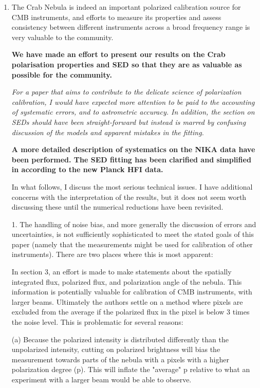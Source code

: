 \documentclass[12pt]{article}
\begin{document}
\begin{enumerate}
    \item 
{
The Crab Nebula is indeed an important polarized calibration source
for CMB instruments, and efforts to measure its properties and assess
consistency between different instruments across a broad frequency
range is very valuable to the community.
}

{\bf We have made an effort to present our results on the Crab polarisation properties and SED so that they are as valuable as possible for the community.}

{\it For a paper that aims to contribute to the delicate science of
polarization calibration, I would have expected more attention to be
paid to the accounting of systematic errors, and to astrometric
accuracy. In addition, the section on SEDs should have been
straight-forward but instead is marred by confusing discussion of the
models and apparent mistakes in the fitting. }

{\bf A more detailed description of systematics on the NIKA data have been
performed. The SED fitting has been clarified and simplified in according
to the new Planck HFI data.}


In what follows, I discuss the most serious technical issues. I have
additional concerns with the interpretation of the results, but it
does not seem worth discussing these until the numerical reductions
have been revisited.


1. The handling of noise bias, and more generally the discussion of
errors and uncertainties, is not sufficiently sophisticated to meet the
stated goals of this paper (namely that the measurements might be used
for calibration of other instruments). There are two places where
this is most apparent:

In section 3, an effort is made to make statements about the spatially
integrated flux, polarized flux, and polarization angle of the nebula.
This information is potentially valuable for calibration of CMB
instruments, with larger beams. Ultimately the authors settle on a
method where pixels are excluded from the average if the polarized
flux in the pixel is below 3 times the noise level. This is
problematic for several reasons:

(a) Because the polarized intensity is distributed differently than
the unpolarized intensity, cutting on polarized brightness will bias
the measurement towards parts of the nebula with a pixels with a
higher polarization degree (p). This will inflate the "average" p
relative to what an experiment with a larger beam would be able to
observe.


\end{enumerate}
\end{document}
